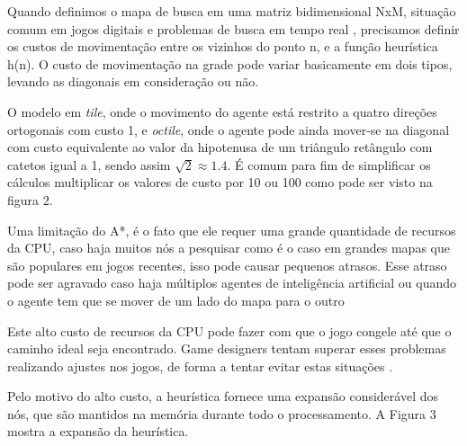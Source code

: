 Quando definimos o mapa de busca em uma matriz bidimensional NxM, situação comum em jogos digitais e problemas de busca em tempo real \cite{Ross_Graham} \cite{Ulysses}, precisamos definir os custos de movimentação entre os vizinhos do ponto n, e a função heurística h(n). O custo de movimentação na grade pode variar basicamente em dois tipos, levando as diagonais em consideração ou não.

O modelo em \textit{tile}, onde o movimento do agente está restrito a quatro direções ortogonais com custo 1, e \textit{octile}, onde o agente pode ainda mover-se na diagonal com custo equivalente ao valor da hipotenusa de um triângulo retângulo com catetos igual a 1, sendo assim  $ \sqrt{2}  \approx 1.4 $. É comum para fim de simplificar os cálculos multiplicar os valores de custo por 10 ou 100 como pode ser visto na figura 2.

\begin{minipage}{\linewidth}
\end{minipage}

Uma limitação do A*, é o fato que ele requer uma grande quantidade de recursos da CPU, caso haja muitos nós a pesquisar como é o caso em grandes mapas que são populares em jogos recentes, isso  pode causar pequenos atrasos.
Esse atraso pode ser agravado caso haja múltiplos agentes de inteligência artificial ou quando o agente tem que se mover de um lado do mapa para o outro 

Este alto custo de recursos da CPU pode fazer com que o jogo congele até que o caminho ideal seja encontrado. Game designers tentam superar esses problemas realizando ajustes nos jogos, de forma a tentar evitar estas situações \cite{Timothy}.

Pelo motivo do alto custo, a heurística fornece uma expansão considerável dos nós, que são mantidos na memória durante todo o processamento. A Figura 3 mostra a expansão da heurística.

